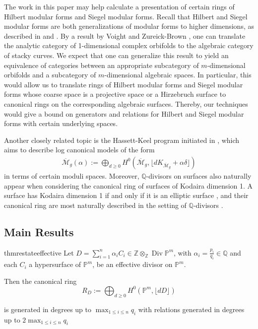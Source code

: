 \documentclass{amsart}
\theoremstyle{plain}
\theoremstyle{definition}
\theoremstyle{remark}
\numberwithin{equation}{section}
\newcommand\ssec{\subsection}
\newcommand\bq{{\mathbb Q}}
\newcommand\bp{{\mathbb P}}
\newcommand\bz{{\mathbb Z}}
\DeclareMathOperator\di{Div}
\begin{document}
The work in this paper may help calculate a presentation of certain rings of
Hilbert 
modular forms and Siegel modular forms. Recall that Hilbert and Siegel 
modular forms are both generalizations of modular forms to higher dimensions,
as described in \cite{geer:siegel-modular} and \cite{bruinier:hilbert-modular}.
By a result by Voight and Zureick-Brown \cite[Proposition 6.1.5]{vzb:stacky}, 
one can translate the analytic category of 1-dimensional complex orbifolds to
the algebraic category of stacky curves. 
We expect that one can generalize this result to yield an equivalence of
categories between an appropriate subcategory of $m$-dimensional orbifolds and
a subcategory of $m$-dimensional algebraic spaces.
In particular, this would allow us to translate rings of Hilbert modular forms
and Siegel modular forms whose coarse space is a projective space or a
Hirzebruch surface to canonical rings on the corresponding algebraic surfaces.
Thereby, our techniques would give a bound on generators and relations for
Hilbert and Siegel modular forms with certain underlying spaces.

Another closely related topic is the Hassett-Keel program 
initiated in \cite{hassett:classical-and-minimal-models}, which aims to describe log canonical models of the form
\begin{align*}
	\overline {\mathscr M}_g(\alpha) := \bigoplus_{d \geq 0}H^0 \left(
	\overline {\mathscr M}_g, \lfloor d K_{\overline{\mathscr M}_g} +
	\alpha\delta \rfloor  \right) 
\end{align*}
in terms of certain moduli spaces. Moreover, $\bq$-divisors on surfaces also naturally
appear when considering the canonical ring of surfaces of Kodaira dimension 1.
A surface has Kodaira dimension 1 if and only if it is an elliptic surface \cite[p. 244]{
barthHPV:compactComplexSurfaces}, and
their canonical ring are most naturally described in the setting of
$\bq$-divisors \cite[Chapter V, Theorem 12.1]{barthHPV:compactComplexSurfaces}. 

\ssec{Main Results}

\begin{restatable}{thm}{restateeffective}
\label{thm:proj-effective-intro}
Let $D = \sum_{i = 1}^{n} \alpha_i C_i \in \bz \otimes_\bz \di \bp^m$, with $\alpha_i =
\frac{p_i}{q_i} \in \bq$ and each $C_i$ a hypersurface of
$\bp^m$, be an effective divisor on $\bp^m$.

Then the canonical ring
\[
	R_D := \bigoplus_{d \geq 0} H^0(\bp^m, \lfloor dD \rfloor)
\]

\noindent
is generated in degrees up to $\max_{1 \leq i \leq n}{q_i}$ with
relations generated in degrees up to $2 \max_{1 \leq i \leq n}{q_i}$
\end{restatable}
\end{document}
